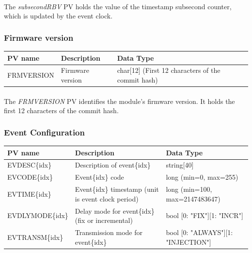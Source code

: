 \documentclass[openany]{article}
\begin{document}
			\paragraph{} The \emph{subsecondRBV} PV holds the value of the timestamp subsecond counter, which is updated by the event clock.

			\bigskip
			\setlength{\fboxsep}{8pt}

		\subsubsection{Firmware version}\label{pvgroup:evg-firmware-version}
			\begin{center}
			\begin{tabular}{| m{2.8cm} m{6cm} m{6cm} |}
			    \hline
			    \bfseries PV name & \bfseries Description & \bfseries Data Type \\ \hline
			    FRMVERSION & Firmware version & char[12] (First 12 characters of the commit hash) \\ \hline
			\end{tabular}
			\end{center}

			\paragraph{} The \emph{FRMVERSION} PV identifies the module's firmware version. It holds the first 12 characters of the commit hash.

		\subsubsection{Event Configuration}\label{pvgroup:evg-event}
			\begin{center}
			\begin{tabular}{| m{2.8cm} m{6cm} m{6cm} |}
			    \hline
			    \bfseries PV name & \bfseries Description & \bfseries Data Type \\ \hline
			    EVDESC\{idx\} & Description of event\{idx\} & string[40] \\ \hline
			    EVCODE\{idx\} & Event\{idx\} code & long (min=0, max=255) \\ \hline
			    EVTIME\{idx\} & Event\{idx\} timestamp (unit is event clock period) & long (min=100, max=2147483647) \\ \hline
			    EVDLYMODE\{idx\} & Delay mode for event\{idx\} (fix or incremental) & bool [0: "FIX"][1: "INCR"] \\ \hline
			    EVTRANSM\{idx\} & Transmission mode for event\{idx\} & bool [0: "ALWAYS"][1: "INJECTION"] \\ \hline
			\end{tabular}
			\end{center}
\end{document}
